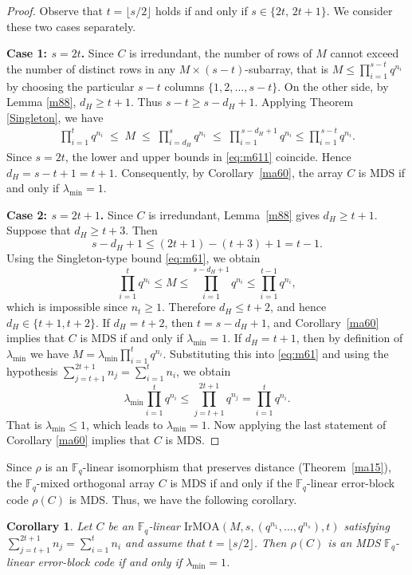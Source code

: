 \documentclass[11pt]{article}
\newtheorem{Corollary}[Theorem]{Corollary}
\newtheorem{Definition and Notation}[Theorem]{Definition and Notation}
\begin{document}
\begin{proof}
Observe that $t=\lfloor s/2\rfloor$ holds if and only if $s\in\{2t,\,2t+1\}$. We consider these two cases separately.

\textbf{Case 1: $s=2t$.}
Since $C$ is irredundant, the number of rows of $ M $ cannot exceed the number of distinct rows in any $M \times (s-t)$-subarray, that is $M\leq \prod_{i=1}^{s-t} q^{n_i}$ by choosing the particular $s-t$ columns $\{1, 2, \ldots, s-t\}$. On the other side, by Lemma \ref{m88}, $d_H\geq t+1$. Thus $s-t\geq s-d_H+1$.  Applying Theorem \ref{Singleton}, we have
\begin{align}\label{eq:m611}
    \prod_{i=1}^{t} q^{n_i} \;\leq\; M \;\leq\; \prod_{i=d_H}^{s} q^{n_i} \;\leq\; \prod_{i=1}^{\,s-d_H+1} q^{n_i}\leq \prod_{i=1}^{\,s-t} q^{n_i}.
\end{align}
Since $s=2t$, the lower and upper bounds in \eqref{eq:m611} coincide. Hence $d_H=s-t+1=t+1.$ Consequently, by Corollary~\ref{ma60}, the array $C$ is MDS if and only if $\lambda_{\min}=1$.

\textbf{Case 2: $s=2t+1$.}
Since $C$ is irredundant, Lemma~\ref{m88} gives $d_H\ge t+1$. 
Suppose that $d_H\ge t+3$. Then
$$s-d_H+1 \le (2t+1)-(t+3)+1 = t-1.$$
Using the Singleton-type bound \eqref{eq:m61}, we obtain
$$
\prod_{i=1}^{t} q^{n_i}\le M\le \prod_{i=1}^{s-d_H+1} q^{n_i}\le \prod_{i=1}^{t-1} q^{n_i},
$$
which is impossible since $n_t\ge 1$. Therefore $d_H\le t+2$, and hence $d_H\in\{t+1,t+2\}.$ If $d_H=t+2$, then $t=s-d_H+1$, and Corollary~\ref{ma60} implies that $C$ is MDS if and only if $\lambda_{\min}=1$.
If $d_H=t+1$, then by definition of $\lambda_{\min}$ we have  $M = \lambda_{\min} \prod_{i=1}^t q^{n_i}$. Substituting this into \eqref{eq:m61} and using the hypothesis $\sum_{j=t+1}^{2t+1} n_j = \sum_{i=1}^t n_i$, we obtain
$$ \lambda_{\min} \prod_{i=1}^t q^{n_i} \le \prod_{j=t+1}^{2t+1} q^{n_j} = \prod_{i=1}^t q^{n_i}. $$
That is $\lambda_{\min} \le 1$, which leads to $\lambda_{\min} = 1$. Now applying the last statement of Corollary \ref{ma60} implies that $C$ is $\mathrm{MDS}$.
\end{proof}

Since $\rho$ is an $\mathbb F_q$-linear isomorphism that preserves distance (Theorem~\ref{ma15}), the $\mathbb F_q$-mixed orthogonal array $C$ is MDS if and only if the $\mathbb F_q$-linear error-block code $\rho(C)$ is MDS. Thus, we have the following corollary.  

\begin{Corollary}
Let $C$ be an $\mathbb F_q$-linear $\mathrm{IrMOA}(M,s,(q^{n_1},\dots,q^{n_s}),t)$ satisfying $\sum_{j=t+1}^{2t+1} n_j = \sum_{i=1}^{t} n_i$ and assume that $t=\lfloor s/2\rfloor$. Then $\rho(C)$ is an MDS $\mathbb F_q$-linear error-block code if and only if $\lambda_{\min}=1$.
\end{Corollary}
\end{document}
